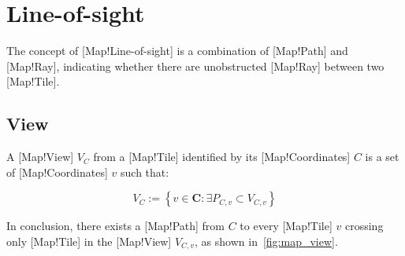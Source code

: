 \section{Line-of-sight}

The concept of [Map!Line-of-sight] is a combination of [Map!Path] and [Map!Ray], indicating whether there are unobstructed [Map!Ray] between two [Map!Tile].

\subsection{View}

A [Map!View] \(V_C\) from a [Map!Tile] identified by its [Map!Coordinates] \(C\) is a set of [Map!Coordinates] \(v\) such that:

\begin{equation}\label{eq:map_view}
    V_C := \left \{ v \in \mathbf{C} : \exists P_{C,v} \subset V_{C,v} \right \}
\end{equation}

In conclusion, there exists a [Map!Path] from \(C\) to every [Map!Tile] \(v\) crossing only [Map!Tile] in the [Map!View] \(V_{C,v}\), as shown in~\ref{fig:map_view}.

